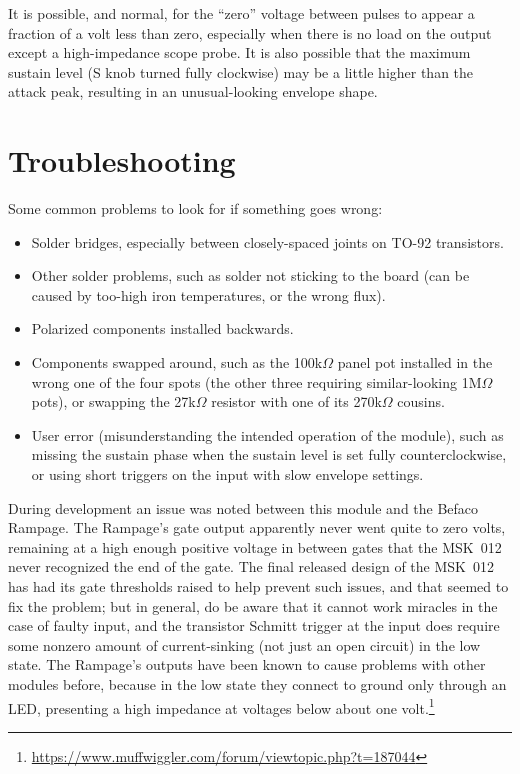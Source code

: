 It is possible, and normal, for the ``zero'' voltage between pulses to
appear a fraction of a volt less than zero, especially when there is no load
on the output except a high-impedance scope probe.  It is also possible that
the maximum sustain level (S knob turned fully clockwise) may be a little
higher than the attack peak, resulting in an unusual-looking envelope shape.

\section{Troubleshooting}

Some common problems to look for if something goes wrong:
\begin{itemize}
  \item Solder bridges, especially between closely-spaced joints on TO-92
    transistors.
  \item Other solder problems, such as solder not sticking to the board (can
    be caused by too-high iron temperatures, or the wrong flux).
  \item Polarized components installed backwards.
  \item Components swapped around, such as the
    100k$\Omega$ panel pot installed in the wrong one of the four spots (the
    other three requiring similar-looking 1M$\Omega$ pots), or swapping the
    27k$\Omega$ resistor with one of its 270k$\Omega$ cousins.
  \item User error (misunderstanding the intended operation of the module),
    such as missing the sustain phase when the sustain level is set fully
    counterclockwise, or using short triggers on the input with slow
    envelope settings.
\end{itemize}

During development an issue was noted between this module and the Befaco
Rampage.  The Rampage's gate output apparently never went quite to zero
volts, remaining at a high enough positive voltage in between gates that the
MSK~012 never recognized the end of the gate.  The final released design of
the MSK~012 has had its gate thresholds raised to help prevent such issues,
and that seemed to fix the problem; but in general, do be aware that it
cannot work miracles in the case of faulty input, and the transistor Schmitt
trigger at the input does require some nonzero amount of current-sinking
(not just an open circuit) in the low state.  The Rampage's outputs have
been known to cause problems with other modules before, because in the low
state they connect to ground only through an LED, presenting a high
impedance at voltages below about one
volt.\footnote{\url{https://www.muffwiggler.com/forum/viewtopic.php?t=187044}}
